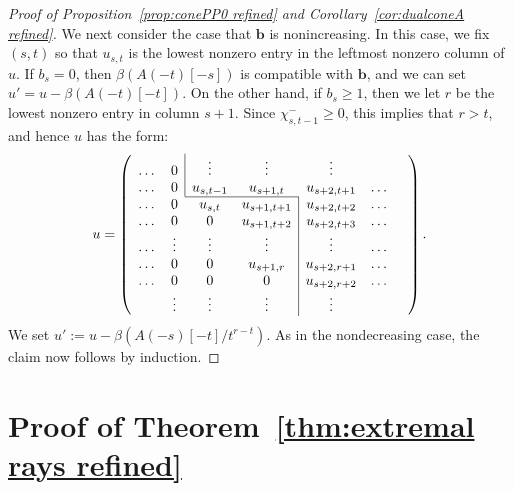 \documentclass[12pt]{amsart}
\theoremstyle{definition}
\theoremstyle{remark}
\newcommand{\bb}{\mathbf{b}}
\begin{document}
\begin{proof}[Proof of Proposition~\ref{prop:conePP0 refined} and Corollary~\ref{cor:dualconeA refined}]
We next consider the case that $\bb$ is nonincreasing.  In this case,  we fix $(s,t)$ so that $u_{s,t}$ is the lowest nonzero entry in the leftmost nonzero column of $u$.  If $b_s=0$, then $\beta(A(-t)[-s])$ is compatible with $\bb$, and we can set $u'=u-\beta(A(-t)[-t])$.  On the other hand, if $b_s\geq 1$, then we let $r$ be the lowest nonzero entry in column $s+1$.  Since $\chi^{-}_{s,t-1}\geq 0$, this implies that $r>t$, and hence $u$ has the form:
\[
u=
\left(
\begin{array}{ccccccc}
\dots&0&\multicolumn{1}{|c}{\vdots}&\vdots&\vdots&\\
\dots&0&\multicolumn{1}{|c}{u_{s,t-1}}&u_{s+1,t}&u_{s+2,t+1}&\dots\\ \cline{3-4}
\dots&0&{u_{s,t}}&u_{s+1,t+1}&\multicolumn{1}{|c}{u_{s+2,t+2}}&\dots\\ 
\dots&0&0&u_{s+1,t+2}&\multicolumn{1}{|c}{u_{s+2,t+3}}&\dots\\
\dots&\vdots &\vdots &\vdots &\multicolumn{1}{|c}{\vdots}&\dots\\
\dots&0&0&u_{s+1,r}&\multicolumn{1}{|c}{u_{s+2,r+1}}&\dots\\
\dots&0&0&0&\multicolumn{1}{|c}{u_{s+2,r+2}}&\dots\\
&\vdots& \vdots&\vdots&\multicolumn{1}{|c}{\vdots}&&\\
\end{array}\right).
\]
We set $u':=u-\beta(A(-s)[-t]/t^{r-t})$.  As in the nondecreasing case, the claim now follows by induction.
\end{proof}





\section{Proof of Theorem~\ref{thm:extremal rays refined}}\label{sec:refined proof}
\end{document}
